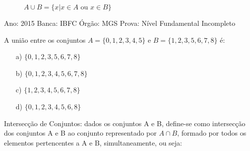 \setlength{\parskip}{5mm}


\begin{figure}[h]

\centering


\caption{$A \cup B = \{x|x \in A\mbox{ ou }x\in B\}$}
\label{fig:uniao}
\end{figure}





\begin{exe}
Ano: 2015 Banca: IBFC Órgão: MGS Prova: Nível Fundamental Incompleto

A união entre os conjuntos $A =\{ 0,1,2,3,4,5\}$ e $B = \{1,2,3,5,6,7,8\}$ é: 

\begin{multicols}{4}
\begin{enumerate}
    \item[a)] $\{0,1,2,3,5,6,7,8\} $
    \item[b)] $\{0,1,2,3,4,5,6,7,8\} $
    \item[c)] $\{1,2,3,4,5,6,7,8\} $
    \item[d)] $\{0,1,2,3,4,5,6,8\} $
\end{enumerate}
\end{multicols}
\end{exe}


\begin{defi}
Intersecção de Conjuntos: dados os conjuntos A e B, define-se como intersecção dos conjuntos A e B ao conjunto representado por $A\cap B$, formado por todos os elementos pertencentes a A e B, simultaneamente, ou seja:  

\end{defi}



